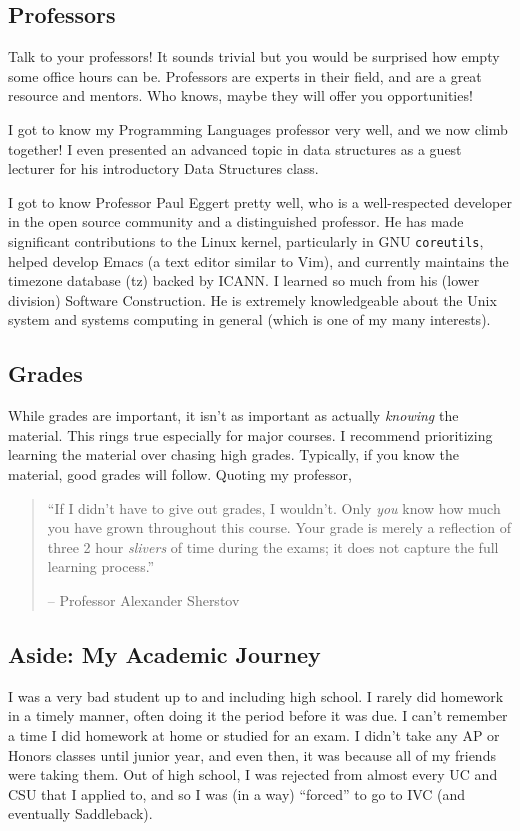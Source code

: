 \documentclass[11pt]{article}
\newenvironment{example}{
\begin{tcolorbox}[title=Example, colback=blue!5!white, colframe=black!75!blue]
}{ \end{tcolorbox} }
\renewcommand{\it}[1]{\textit{{#1}}}
\begin{document}
\subsection{Professors}
Talk to your professors! It sounds trivial but you would be surprised how empty
some office hours can be. Professors are experts in their field, and are a great
resource and mentors. Who knows, maybe they will offer you opportunities!
\begin{example}
  I got to know my Programming Languages professor very well, and we now climb
  together! I even presented an advanced topic in data structures as a guest
  lecturer for his introductory Data Structures class.
\end{example}

\begin{example}
  I got to know Professor Paul Eggert pretty well, who is a well-respected
  developer in the open source community and a distinguished professor. He has
  made significant contributions to the Linux kernel, particularly in GNU
  \texttt{coreutils}, helped develop Emacs (a text editor similar to Vim), and
  currently maintains the timezone database (tz) backed by ICANN. I learned so
  much from his (lower division) Software Construction. He is extremely
  knowledgeable about the Unix system and systems computing in general (which is
  one of my many interests).
\end{example}

\subsection{Grades}
While grades are important, it isn't as important as actually \it{knowing} the
material. This rings true especially for  major courses. I recommend
prioritizing learning the material over chasing high grades. Typically, if you
know the material, good grades will follow. Quoting my professor,
\begin{quote}
  ``If I didn't have to give out grades, I wouldn't. Only \it{you} know how much
  you have grown throughout this course. Your grade is merely a reflection of
  three 2 hour \it{slivers} of time during the exams; it does not capture the
  full learning process.''
  \vspace{-1em}
  \begin{flushright}
    -- Professor Alexander Sherstov
  \end{flushright}
\end{quote}

\subsection{Aside: My Academic Journey}
I was a very bad student up to and including high school. I rarely did homework
in a timely manner, often doing it the period before it was due. I can't
remember a time I did homework at home or studied for an exam. I didn't take any
AP or Honors classes until junior year, and even then, it was because all of my
friends were taking them. Out of high school, I was rejected from almost every
UC and CSU that I applied to, and so I was (in a way) ``forced'' to go to IVC
(and eventually Saddleback).
\end{document}
